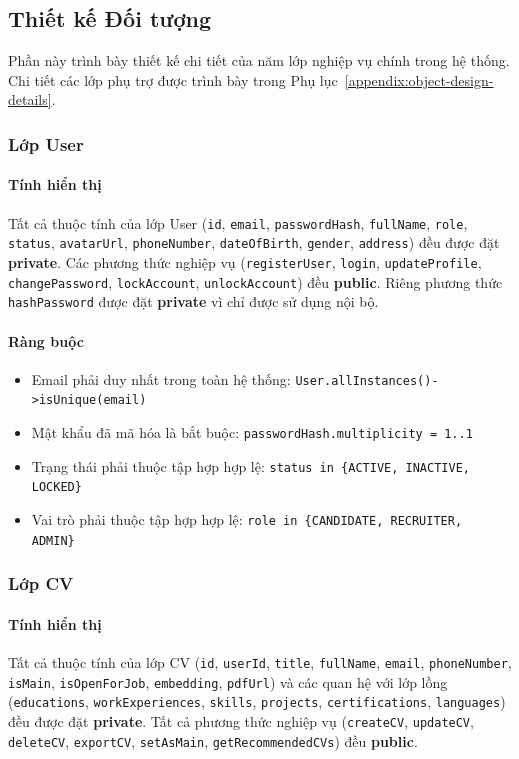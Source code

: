 \subsection{Thiết kế Đối tượng}
\label{subsec:object-design}

Phần này trình bày thiết kế chi tiết của năm lớp nghiệp vụ chính trong hệ thống. Chi tiết các lớp phụ trợ được trình bày trong Phụ lục~\ref{appendix:object-design-details}.

\subsubsection{Lớp User}

\paragraph{Tính hiển thị}
Tất cả thuộc tính của lớp User (\texttt{id}, \texttt{email}, \texttt{passwordHash}, \texttt{fullName}, \texttt{role}, \texttt{status}, \texttt{avatarUrl}, \texttt{phoneNumber}, \texttt{dateOfBirth}, \texttt{gender}, \texttt{address}) đều được đặt \textbf{private}. Các phương thức nghiệp vụ (\texttt{registerUser}, \texttt{login}, \texttt{updateProfile}, \texttt{changePassword}, \texttt{lockAccount}, \texttt{unlockAccount}) đều \textbf{public}. Riêng phương thức \texttt{hashPassword} được đặt \textbf{private} vì chỉ được sử dụng nội bộ.

\paragraph{Ràng buộc}
\begin{itemize}
    \item Email phải duy nhất trong toàn hệ thống: \texttt{User.allInstances()->isUnique(email)}
    \item Mật khẩu đã mã hóa là bắt buộc: \texttt{passwordHash.multiplicity = 1..1}
    \item Trạng thái phải thuộc tập hợp hợp lệ: \texttt{status in \{ACTIVE, INACTIVE, LOCKED\}}
    \item Vai trò phải thuộc tập hợp hợp lệ: \texttt{role in \{CANDIDATE, RECRUITER, ADMIN\}}
\end{itemize}

\subsubsection{Lớp CV}

\paragraph{Tính hiển thị}
Tất cả thuộc tính của lớp CV (\texttt{id}, \texttt{userId}, \texttt{title}, \texttt{fullName}, \texttt{email}, \texttt{phoneNumber}, \texttt{isMain}, \texttt{isOpenForJob}, \texttt{embedding}, \texttt{pdfUrl}) và các quan hệ với lớp lồng (\texttt{educations}, \texttt{workExperiences}, \texttt{skills}, \texttt{projects}, \texttt{certifications}, \texttt{languages}) đều được đặt \textbf{private}. Tất cả phương thức nghiệp vụ (\texttt{createCV}, \texttt{updateCV}, \texttt{deleteCV}, \texttt{exportCV}, \texttt{setAsMain}, \texttt{getRecommendedCVs}) đều \textbf{public}.

